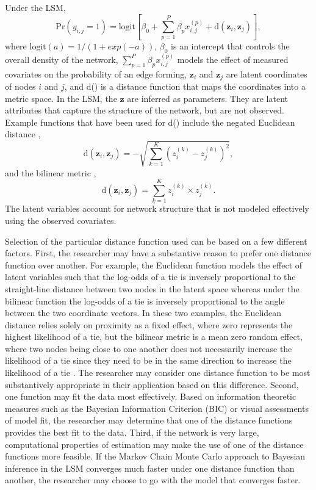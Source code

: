 \documentclass[fleqn,12pt]{wlscirep}
\begin{document}
Under the LSM, $$\text{Pr}(y_{i,j} = 1) = \text{logit}\left[\beta_0 + \sum_{p = 1}^P \beta_p x_{i,j}^{(p)} + \text{d}(\bm{z}_i,\bm{z}_j) \right],$$ where  $\text{logit}(a) = 1/(1+exp(-a))$, $\beta_0$ is an intercept that controls the overall density of the network, $\sum_{p = 1}^P \beta_p x_{i,j}^{(p)}$ models the effect of measured covariates on the probability of an edge forming,  $\bm{z}_i$ and $\bm{z}_j$ are latent coordinates of nodes $i$ and $j$, and d() is a distance function that maps the coordinates into a metric space. In the LSM, the $\bm{z}$ are inferred as parameters. They are latent attributes that capture the structure of the network, but are not observed. Example functions that have been used for d() include the negated Euclidean distance \citep[e.g., ][]{mahmood2017will}, $$ \text{d}(\bm{z}_i,\bm{z}_j)  = -\sqrt{ \sum_{k=1}^K \left( z_i^{(k)} - z_j^{(k)} \right)^2}, $$ and the bilinear metric \citep[e.g., ][]{vance2009social}, $$ \text{d}(\bm{z}_i,\bm{z}_j)  =  \sum_{k=1}^K  z_i^{(k)}\times z_j^{(k)}.  $$ The latent variables account for network structure that is not modeled effectively using the observed covariates. 

Selection of the particular distance function used can be based on a few different factors. First, the researcher may have a substantive reason to prefer one distance function over another. For example, the Euclidean function models the effect of latent variables such that the log-odds of a tie is inversely proportional to the straight-line distance between two nodes in the latent space whereas under the bilinear function the log-odds of a tie is inversely proportional to the angle between the two coordinate vectors. In these two examples, the Euclidean distance relies solely on proximity as a fixed effect, where zero represents the highest likelihood of a tie, but the bilinear metric is a mean zero random effect, where two nodes being close to one another does not necessarily increase the likelihood of a tie since they need to be in the same direction to increase the likelihood of a tie \citep{dorff2016latent}. The researcher may consider one distance function to be most substantively appropriate in their application based on this difference. Second, one function may fit the data most effectively. Based on information theoretic measures such as the Bayesian Information Criterion (BIC) \citep{wang2009wilcoxon} or visual assessments of model fit, the researcher may determine that one of the distance functions provides the best fit to the data. Third, if the network is very large, computational properties of estimation may make the use of one of the distance functions more feasible. If the Markov Chain Monte Carlo approach to Bayesian inference in the LSM converges much faster under one distance function than another, the researcher may choose to go with the model that converges faster.
\end{document}
